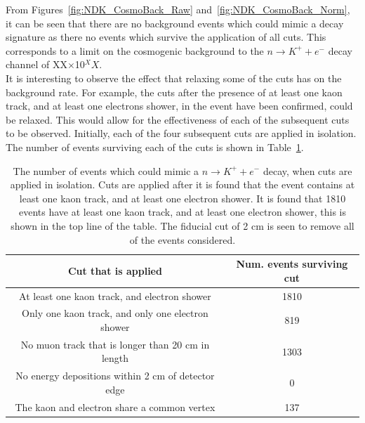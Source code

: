 From Figures~\ref{fig:NDK_CosmoBack_Raw} and~\ref{fig:NDK_CosmoBack_Norm}, it can be seen that there are no background events which could mimic a decay signature as there no events which survive the application of all cuts. This corresponds to a limit on the cosmogenic background to the $n \rightarrow K^{+} + e^{-}$ decay channel of XX$\times$10$^XX$. \\

It is interesting to observe the effect that relaxing some of the cuts has on the background rate. For example, the cuts after the presence of at least one kaon track, and at least one electrons shower, in the event have been confirmed, could be relaxed. This would allow for the effectiveness of each of the subsequent cuts to be observed. Initially, each of the four subsequent cuts are applied in isolation. The number of events surviving each of the cuts is shown in Table~\ref{tab:NDK_CosmoBack_EachCut}. \\

\begin{table}
  \caption[The number of events which could mimic a $n \rightarrow K^{+} + e^{-}$ decay, when cuts are applied in isolation]
          {The number of events which could mimic a $n \rightarrow K^{+} + e^{-}$ decay, when cuts are applied in isolation. Cuts are applied after it is found that the event contains at least one kaon track, and at least one electron shower. It is found that 1810 events have at least one kaon track, and at least one electron shower, this is shown in the top line of the table. The fiducial cut of 2 cm is seen to remove all of the events considered.}
  \centering
  \label{tab:NDK_CosmoBack_EachCut}
  \begin{tabular}{c c}
    \toprule
        {Cut that is applied}                                & {Num. events surviving cut} \\
        \midrule
        At least one kaon track, and electron shower         & 1810                                \\

        Only one kaon track, and only one electron shower    & 819                                 \\

        No muon track that is longer than 20 cm in length    & 1303                                \\

        No energy depositions within 2 cm of detector edge   & 0                                   \\

        The kaon and electron share a common vertex          & 137                                 \\
        \bottomrule
  \end{tabular}
\end{table}

